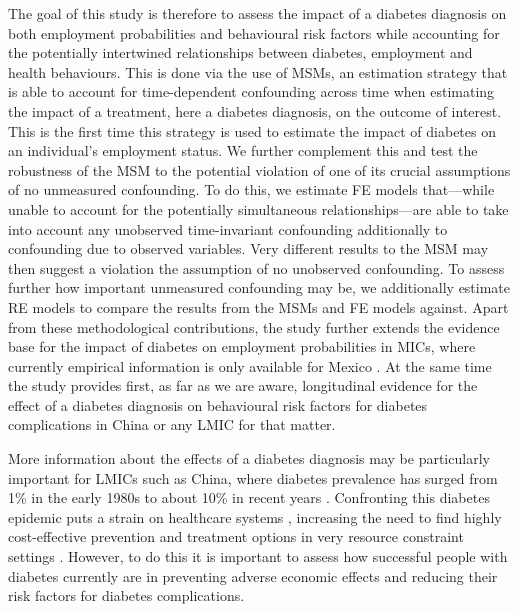 The goal of this study is therefore to assess the impact of a diabetes diagnosis on both employment probabilities and behavioural risk factors while accounting for the potentially intertwined relationships between diabetes, employment and health behaviours. This is done via the use of \acp{MSM}, an estimation strategy that is able to account for time-dependent confounding across time \parencite{Robins2000} when estimating the impact of a treatment, here a diabetes diagnosis, on the outcome of interest. This is the first time this strategy is used to estimate the impact of diabetes on an individual's employment status. We further complement this and test the robustness of the \ac{MSM} to the potential violation of one of its crucial assumptions of no unmeasured confounding. To do this, we estimate \ac{FE} models that---while unable to account for the potentially simultaneous relationships---are able to take into account any unobserved time-invariant confounding additionally to confounding due to observed variables. Very different results to the \ac{MSM} may then suggest a violation the assumption of no unobserved confounding. To assess further how important unmeasured confounding may be, we additionally estimate \ac{RE} models to compare the results from the \acp{MSM} and \ac{FE} models against. Apart from these methodological contributions, the study further extends the evidence base for the impact of diabetes on employment probabilities in \acp{MIC}, where currently empirical information is only available for Mexico \parencite{Seuring2016}. At the same time the study provides first, as far as we are aware, longitudinal evidence for the effect of a diabetes diagnosis on behavioural risk factors for diabetes complications in China or any \ac{LMIC} for that matter.

 
More information about the effects of a diabetes diagnosis may be particularly important for \acp{LMIC} such as China, where diabetes prevalence has surged from 1\% in the early 1980s to about 10\% in recent years \autocite{Hu2011,Risk2016}. Confronting this diabetes epidemic puts a strain on healthcare systems \parencite{Seuring2015a}, increasing the need to find highly cost-effective prevention and treatment options in very resource constraint settings \parencite{WHOresearchpriorities2010}. However, to do this it is important to assess how successful people with diabetes currently are in preventing adverse economic effects and reducing their risk factors for diabetes complications.





